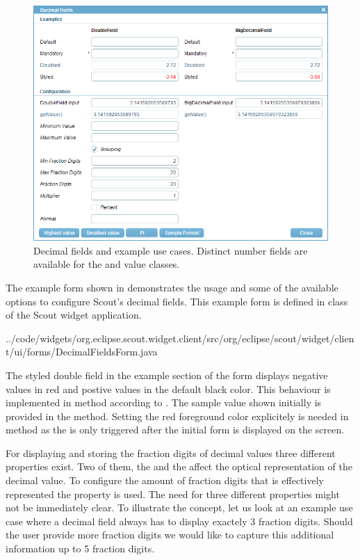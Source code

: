 \documentclass[a4paper,10pt,twoside]{book}
\begin{document}
{\begin{figure}
\includegraphics[width=15cm]{decimalfield.png}
\caption{Decimal fields and example use cases.
Distinct number fields are available for the  and  value classes.
}
\end{figure}

The example form shown in  demonstrates the usage and some of the available options to configure Scout's decimal fields.
This example form is defined in class  of the Scout widget application. 


{../code/widgets/org.eclipse.scout.widget.client/src/org/eclipse/scout/widget/client/ui/forms/DecimalFieldsForm.java}

The styled double field in the example section of the form displays negative values in red and postive values in the default black color. 
This behaviour is implemented in method  according to . 
The sample value shown initially is provided in the  method. 
Setting the red foreground color explicitely is needed in method  as the  is only triggered after the initial form is displayed on the screen. 

For displaying and storing the fraction digits of decimal values three different properties exist. 
Two of them, the  and the  affect the optical representation of the decimal value. 
To configure the amount of fraction digits that is effectively represented the property  is used. 
The need for three different properties might not be immediately clear. 
To illustrate the concept, let us look at an example use case where a decimal field always has to display exactely 3 fraction digits. 
Should the user provide more fraction digits we would like to capture this additional information up to 5 fraction digits. 

}
\end{document}
